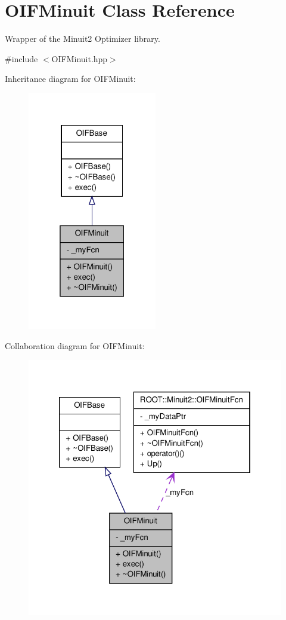 \hypertarget{classOIFMinuit}{
\section{OIFMinuit Class Reference}
\label{d5/db7/classOIFMinuit}
}


Wrapper of the Minuit2 Optimizer library.  




{\ttfamily \#include $<$OIFMinuit.hpp$>$}



Inheritance diagram for OIFMinuit:\nopagebreak
\begin{figure}[H]
\begin{center}
\leavevmode
\includegraphics[width=160pt]{dc/daa/classOIFMinuit__inherit__graph}
\end{center}
\end{figure}


Collaboration diagram for OIFMinuit:\nopagebreak
\begin{figure}[H]
\begin{center}
\leavevmode
\includegraphics[width=322pt]{d4/da7/classOIFMinuit__coll__graph}
\end{center}
\end{figure}
